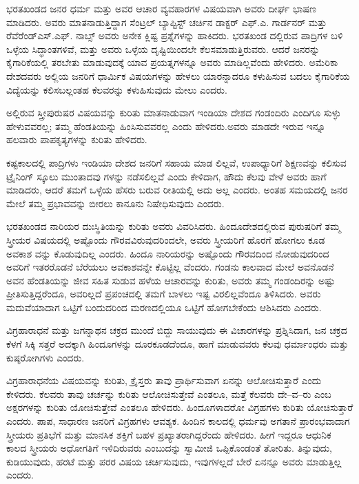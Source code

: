 ಭರತಖಂಡದ ಜನರ ಧರ್ಮ ಮತ್ತು ಅವರ ಆಚಾರ ವ್ಯವಹಾರಗಳ ವಿಷಯವಾಗಿ ಅವರು ದೀರ್ಘ ಭಾಷಣ ಮಾಡಿದರು. ಅವರು ಮಾತನಾಡುತ್ತಿದ್ದಾಗ ಸೆಂಟ್ರಲ್​ ಬ್ಯಾಪ್ಟಿಸ್ಟ್​ ಚರ್ಚಿನ ಡಾಕ್ಟರ್​ ಎಫ್​.ಎ. ಗಾರ್ಡನರ್​ ಮತ್ತು ರೆವೆರೆಂಡ್​ ಎಸ್​.ಎಫ್​. ನಾಬ್ಸ್​ ಅವರು ಅನೇಕ ಕ್ಲಿಷ್ಟ ಪ್ರಶ್ನೆಗಳನ್ನು ಹಾಕಿದರು. ಭರತಖಂಡ ದಲ್ಲಿರುವ ಪಾದ್ರಿಗಳ ಬಳಿ ಒಳ್ಳೆಯ ಸಿದ್ಧಾಂತಗಳಿವೆ, ಮತ್ತು ಅವರು ಒಳ್ಳೆಯ ದೃಷ್ಟಿಯಿಂದಲೇ ಕೆಲಸಮಾಡುತ್ತಿರುವರು. ಆದರೆ ಜನರನ್ನು ಕೈಗಾರಿಕೆಯಲ್ಲಿ ತರಬೇತು ಮಾಡುವುದಕ್ಕೆ ಯಾವ ಪ್ರಯತ್ನಗಳನ್ನೂ ಅವರು ಮಾಡಿಲ್ಲವೆಂದು ಹೇಳಿದರು. ಅಮೆರಿಕಾ ದೇಶದವರು ಅಲ್ಲಿಯ ಜನರಿಗೆ ಧಾರ್ಮಿಕ ವಿಷಯಗಳನ್ನು ಹೇಳಲು ಯಾರನ್ನಾದರೂ ಕಳುಹಿಸುವ ಬದಲು ಕೈಗಾರಿಕೆಯ ವಿದ್ಯೆಯನ್ನು ಕಲಿಸಬಲ್ಲಂತಹ ಕೆಲವರನ್ನು ಕಳುಹಿಸುವುದು ಮೇಲು ಎಂದರು.

ಅಲ್ಲಿರುವ ಸ್ತ್ರೀಪುರುಷರ ವಿಷಯವನ್ನು ಕುರಿತು ಮಾತನಾಡುವಾಗ ಇಂಡಿಯಾ ದೇಶದ ಗಂಡಂದಿರು ಎಂದಿಗೂ ಸುಳ್ಳು ಹೇಳುವವರಲ್ಲ; ತಮ್ಮ ಹೆಂಡತಿಯನ್ನು ಹಿಂಸಿಸುವವರಲ್ಲ ಎಂದು ಹೇಳಿದರು.ಅವರು ಮಾಡದೇ ಇರುವ ಇನ್ನೂ ಹಲವಾರು ಪಾಪಕೃತ್ಯಗಳನ್ನು ಕುರಿತು ಹೇಳಿದರು.

ಕಷ್ಟಕಾಲದಲ್ಲಿ ಪಾದ್ರಿಗಳು ಇಂಡಿಯಾ ದೇಶದ ಜನರಿಗೆ ಸಹಾಯ ಮಾಡ ಲಿಲ್ಲವೆ, ಉಪಾಧ್ಯಾರಿಗೆ ಶಿಕ್ಷಣವನ್ನು ಕಲಿಸುವ ಟ್ರೈನಿಂಗ್​ ಸ್ಕೂಲು ಮುಂತಾದವು ಗಳನ್ನು ನಡೆಸಲಿಲ್ಲವೆ ಎಂದು ಕೇಳಿದಾಗ, ಹೌದು ಕೆಲವು ವೇಳೆ ಅವರು ಹಾಗೆ ಮಾಡಿದರು, ಆದರೆ ತಮಗೆ ಒಳ್ಳೆಯ ಹೆಸರು ಬರುವ ರೀತಿಯಲ್ಲಿ ಅದು ಅಲ್ಲ ಎಂದರು. ಅಂತಹ ಸಮಯದಲ್ಲಿ ಜನರ ಮೇಲೆ ತಮ್ಮ ಪ್ರಭಾವವನ್ನು ಬೀರಲು ಕಾನೂನು ನಿಷೇಧಿಸುವುದು ಎಂದರು.

ಭರತಖಂಡದ ನಾರಿಯರ ದುಃಸ್ಥಿತಿಯನ್ನು ಕುರಿತು ಅವರು ವಿವರಿಸಿದರು. ಹಿಂದೂದೇಶದಲ್ಲಿರುವ ಪುರುಷರಿಗೆ ತಮ್ಮ ಸ್ತ್ರೀಯರ ವಿಷಯದಲ್ಲಿ ಅಷ್ಟೊಂದು ಗೌರವವಿರುವುದರಿಂದಲೇ, ಅವರು ಸ್ತ್ರೀಯರಿಗೆ ಹೊರಗೆ ಹೋಗಲು ಕೂಡ ಅವಕಾಶ ವನ್ನು ಕೊಡುವುದಿಲ್ಲ ಎಂದರು. ಹಿಂದೂ ನಾರಿಯರನ್ನು ಅಷ್ಟೊಂದು ಗೌರವದಿಂದ ನೋಡುವುದರಿಂದ ಅವರಿಗೆ ಇತರರೊಡನೆ ಬೆರೆಯಲು ಅವಕಾಶವನ್ನೇ ಕೊಟ್ಟಿಲ್ಲ ವೆಂದರು. ಗಂಡನು ಕಾಲವಾದ ಮೇಲೆ ಅವನೊಡನೆ ಅವನ ಹೆಂಡತಿಯನ್ನು ಜೀವ ಸಹಿತ ಸುಡುವ ಹಳೆಯ ಆಚಾರವನ್ನು ಕುರಿತು, ಅವರು ತಮ್ಮ ಗಂಡಂದಿರನ್ನು ಅಷ್ಟು ಪ್ರೀತಿಸುತ್ತಿದ್ದರೆಂದೂ, ಅವರಿಲ್ಲದೆ ಪ್ರಪಂಚದಲ್ಲಿ ತಮಗೆ ಬಾಳಲು ಇಷ್ಟ ವಿರಲಿಲ್ಲವೆಂದೂ ತಿಳಿಸಿದರು. ಅವರು ಮದುವೆಯಾದಾಗ ಒಟ್ಟಿಗೆ ಬಂದುದರಿಂದ ಮರಣದಲ್ಲಿಯೂ ಒಟ್ಟಿಗೆ ಹೋಗಬೇಕೆಂದು ಆಶಿಸಿದರು ಎಂದರು.

ವಿಗ್ರಹಾರಾಧನೆ ಮತ್ತು ಜಗನ್ನಾಥನ ಚಕ್ರದ ಮುಂದೆ ಬಿದ್ದು ಸಾಯುವುದು ಈ ವಿಚಾರಗಳನ್ನು ಪ್ರಶ್ನಿಸಿದಾಗ, ಜನ ಚಕ್ರದ ಕೆಳಗೆ ಸಿಕ್ಕಿ ಸತ್ತರೆ ಅದಕ್ಕಾಗಿ ಹಿಂದೂಗಳನ್ನು ದೂರಕೂಡದೆಂದೂ, ಹಾಗೆ ಮಾಡುವವರು ಕೆಲವು ಧರ್ಮಾಂಧರು ಮತ್ತು ಕುಷ್ಠರೋಗಿಗಳು ಎಂದರು.

ವಿಗ್ರಹಾರಾಧನೆಯ ವಿಷಯವನ್ನು ಕುರಿತು, ಕ್ರೈಸ್ತರು ತಾವು ಪ್ರಾರ್ಥಿಸುವಾಗ ಏನನ್ನು ಆಲೋಚಿಸುತ್ತಾರೆ ಎಂದು ಕೇಳಿದರು. ಕೆಲವರು ತಾವು ಚರ್ಚನ್ನು ಕುರಿತು ಆಲೋಚಿಸುತ್ತೇವೆ ಎಂತಲೂ, ಮತ್ತೆ ಕೆಲವರು ದೇ–ವ–ರು ಎಂಬ ಅಕ್ಷರಗಳನ್ನು ಕುರಿತು ಯೋಚಿಸುತ್ತೇವೆ ಎಂತಲೂ ಹೇಳಿದರು. ಹಿಂದೂಗಳಾದರೋ ವಿಗ್ರಹಗಳು ಕುರಿತು ಯೋಚಿಸುತ್ತಾರೆ ಎಂದರು. ಪಾಪ, ಸಾಧಾರಣ ಜನರಿಗೆ ವಿಗ್ರಹಗಳು ಆವಶ್ಯಕ. ಹಿಂದಿನ ಕಾಲದಲ್ಲಿ ಧರ್ಮವು ಅಗತಾನೆ ಪ್ರಾರಂಭವಾದಾಗ ಸ್ತ್ರೀಯರು ಪ್ರತಿಭೆಗೆ ಮತ್ತು ಮಾನಸಿಕ ಶಕ್ತಿಗೆ ಬಹಳ ಪ್ರಖ್ಯಾತರಾಗಿದ್ದರೆಂದು ಹೇಳಿದರು. ಹೀಗೆ ಇದ್ದರೂ ಆಧುನಿಕ ಕಾಲದ ಸ್ತ್ರೀಯರು ಅಧೋಗತಿಗೆ ಇಳಿದಿರುವರು ಎಂಬುದನ್ನು ಸ್ವಾಮೀಜಿ ಒಪ್ಪಿಕೊಂಡಂತೆ ತೋರಿತು. ತಿನ್ನುವುದು, ಕುಡಿಯುವುದು, ಹರಟೆ ಮತ್ತು ಪರರ ವಿಷಯ ಚರ್ಚಿಸುವುದು, ಇವುಗಳಲ್ಲದೆ ಬೇರೆ ಏನನ್ನೂ ಅವರು ಮಾಡುತ್ತಿಲ್ಲ ಎಂದರು.

